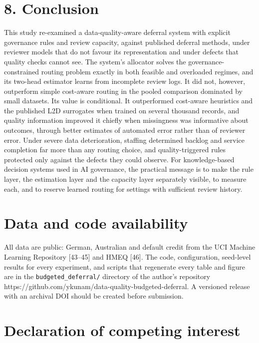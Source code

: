 \documentclass[
  11pt,
]{article}
\begin{document}
\hypertarget{conclusion}{%
\section{8. Conclusion}\label{conclusion}}

This study re-examined a data-quality-aware deferral system with
explicit governance rules and review capacity, against published
deferral methods, under reviewer models that do not favour its
representation and under defects that quality checks cannot see. The
system's allocator solves the governance-constrained routing problem
exactly in both feasible and overloaded regimes, and its two-head
estimator learns from incomplete review logs. It did not, however,
outperform simple cost-aware routing in the pooled comparison dominated
by small datasets. Its value is conditional. It outperformed cost-aware
heuristics and the published L2D surrogates when trained on several
thousand records, and quality information improved it chiefly when
missingness was informative about outcomes, through better estimates of
automated error rather than of reviewer error. Under severe data
deterioration, staffing determined backlog and service completion far
more than any routing choice, and quality-triggered rules protected only
against the defects they could observe. For knowledge-based decision
systems used in AI governance, the practical message is to make the rule
layer, the estimation layer and the capacity layer separately visible,
to measure each, and to reserve learned routing for settings with
sufficient review history.

\hypertarget{data-and-code-availability}{%
\section{Data and code availability}\label{data-and-code-availability}}

All data are public: German, Australian and default credit from the UCI
Machine Learning Repository {[}43--45{]} and HMEQ {[}46{]}. The code,
configuration, seed-level results for every experiment, and scripts that
regenerate every table and figure are in the
\texttt{budgeted\_deferral/} directory of the author's repository
https://github.com/ykunam/data-quality-budgeted-deferral. A versioned
release with an archival DOI should be created before submission.

\hypertarget{declaration-of-competing-interest}{%
\section{Declaration of competing
interest}\label{declaration-of-competing-interest}}
\end{document}
